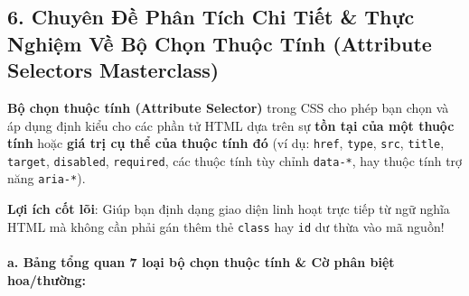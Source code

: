 \documentclass[11pt,oneside]{book}
\newcommand{\codeinline}[1]{\textcolor{accentOrange}{\texttt{#1}}}
\newcommand{\term}[1]{\textbf{\textcolor{primaryBlue}{#1}}}
\begin{document}
\subsection{6. Chuyên Đề Phân Tích Chi Tiết \& Thực Nghiệm Về Bộ Chọn Thuộc Tính (Attribute Selectors Masterclass)}

\begin{conceptBox}
\textbf{Bộ chọn thuộc tính (\term{Attribute Selector})} trong CSS cho phép bạn chọn và áp dụng định kiểu cho các phần tử HTML dựa trên sự \textbf{tồn tại của một thuộc tính} hoặc \textbf{giá trị cụ thể của thuộc tính đó} (ví dụ: \codeinline{href}, \codeinline{type}, \codeinline{src}, \codeinline{title}, \codeinline{target}, \codeinline{disabled}, \codeinline{required}, các thuộc tính tùy chỉnh \codeinline{data-*}, hay thuộc tính trợ năng \codeinline{aria-*}).
\par\vspace{3pt}
\textbf{Lợi ích cốt lõi}: Giúp bạn định dạng giao diện linh hoạt trực tiếp từ ngữ nghĩa HTML mà không cần phải gán thêm thẻ \codeinline{class} hay \codeinline{id} dư thừa vào mã nguồn!
\end{conceptBox}

\paragraph{a. Bảng tổng quan 7 loại bộ chọn thuộc tính \& Cờ phân biệt hoa/thường:}
\end{document}
